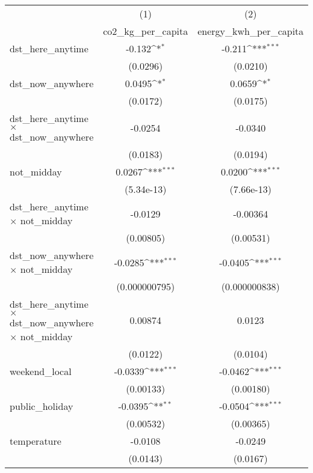 {
\def\sym#1{\ifmmode^{#1}\else\(^{#1}\)\fi}
\begin{tabular}{l*{2}{c}}
\hline\hline
                    &\multicolumn{1}{c}{(1)}&\multicolumn{1}{c}{(2)}\\
                    &\multicolumn{1}{c}{co2\_kg\_per\_capita}&\multicolumn{1}{c}{energy\_kwh\_per\_capita}\\
\hline
dst\_here\_anytime    &      -0.132\sym{*}  &      -0.211\sym{***}\\
                    &    (0.0296)         &    (0.0210)         \\
[1em]
dst\_now\_anywhere    &      0.0495\sym{*}  &      0.0659\sym{*}  \\
                    &    (0.0172)         &    (0.0175)         \\
[1em]
dst\_here\_anytime $\times$ dst\_now\_anywhere&     -0.0254         &     -0.0340         \\
                    &    (0.0183)         &    (0.0194)         \\
[1em]
not\_midday          &      0.0267\sym{***}&      0.0200\sym{***}\\
                    &  (5.34e-13)         &  (7.66e-13)         \\
[1em]
dst\_here\_anytime $\times$ not\_midday&     -0.0129         &    -0.00364         \\
                    &   (0.00805)         &   (0.00531)         \\
[1em]
dst\_now\_anywhere $\times$ not\_midday&     -0.0285\sym{***}&     -0.0405\sym{***}\\
                    &(0.000000795)         &(0.000000838)         \\
[1em]
dst\_here\_anytime $\times$ dst\_now\_anywhere $\times$ not\_midday&     0.00874         &      0.0123         \\
                    &    (0.0122)         &    (0.0104)         \\
[1em]
weekend\_local       &     -0.0339\sym{***}&     -0.0462\sym{***}\\
                    &   (0.00133)         &   (0.00180)         \\
[1em]
public\_holiday      &     -0.0395\sym{**} &     -0.0504\sym{***}\\
                    &   (0.00532)         &   (0.00365)         \\
[1em]
temperature         &     -0.0108         &     -0.0249         \\
                    &    (0.0143)         &    (0.0167)         \\

\end{tabular}}
